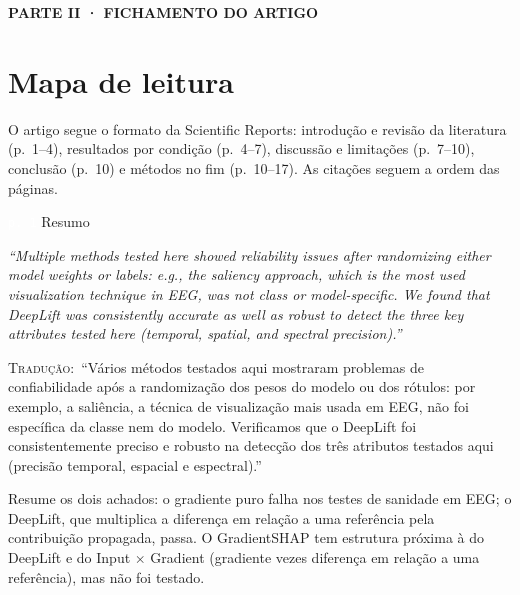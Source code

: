 \documentclass[11pt,a4paper]{article}
\newcommand{\pagechip}[1]{{\setlength{\fboxsep}{1.5pt}\colorbox{cAcc}{\textcolor{white}{\scriptsize\texttt{#1}}}}}
\newcommand{\partbar}[1]{\par\vspace{1.2em}\noindent\colorbox{black!80}{\parbox{\dimexpr\linewidth-2\fboxsep}{\color{white}\bfseries\sffamily\MakeUppercase{#1}}}\par\vspace{0.4em}}
\newenvironment{origquote}{\par\itshape\small}{\par}
\newenvironment{tradquote}{\par\small\textsc{Tradução:}\ }{\par}
\newcommand{\explab}[1]{\par\smallskip{\small\color{cAcc}\textbf{\MakeUppercase{#1}}}\par}
\begin{document}
\partbar{Parte II · Fichamento do artigo}

\section{Mapa de leitura}
O artigo segue o formato da Scientific Reports: introdução e revisão da literatura (p.~1--4), resultados por condição (p.~4--7), discussão e limitações (p.~7--10), conclusão (p.~10) e métodos no fim (p.~10--17). As citações seguem a ordem das páginas.

\begin{citacard}{\pagechip{p. 1} Resumo}
\begin{origquote}“Multiple methods tested here showed reliability issues after randomizing either model weights or labels: e.g., the saliency approach, which is the most used visualization technique in EEG, was not class or model-specific. We found that DeepLift was consistently accurate as well as robust to detect the three key attributes tested here (temporal, spatial, and spectral precision).”\end{origquote}
\begin{tradquote}“Vários métodos testados aqui mostraram problemas de confiabilidade após a randomização dos pesos do modelo ou dos rótulos: por exemplo, a saliência, a técnica de visualização mais usada em EEG, não foi específica da classe nem do modelo. Verificamos que o DeepLift foi consistentemente preciso e robusto na detecção dos três atributos testados aqui (precisão temporal, espacial e espectral).”\end{tradquote}
\explab{Explicação}
Resume os dois achados: o gradiente puro falha nos testes de sanidade em EEG; o DeepLift, que multiplica a diferença em relação a uma referência pela contribuição propagada, passa. O GradientSHAP tem estrutura próxima à do DeepLift e do Input $\times$ Gradient (gradiente vezes diferença em relação a uma referência), mas não foi testado.
\end{citacard}
\end{document}
